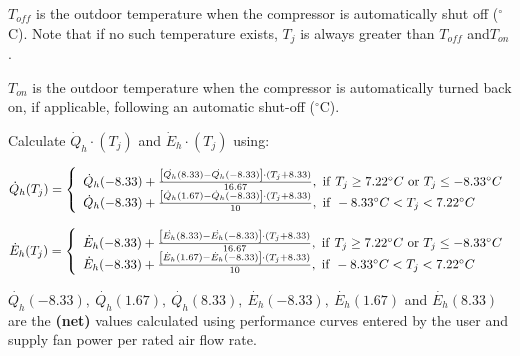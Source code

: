 \({T_{off}}\) is the outdoor temperature when the compressor is automatically shut off (\(^{\circ}\)C). Note that if no such temperature exists, \({T_j}\) is always greater than \({T_{off}}\) and\({T_{on}}\).

\({T_{on}}\) is the outdoor temperature when the compressor is automatically turned back on, if applicable, following an automatic shut-off (\(^{\circ}\)C).

Calculate \(\dot{Q}_{h} \cdot ({T_j})\) and \(\dot{E}_{h} \cdot ({T_j})\) using:

\begin{equation}
\dot{Q}_{h}({T_j}) = \left\{ \begin{array}{l}\dot{Q}_{h}(-8.33) + \frac{{\left[ {\dot{{Q}_{h}}(8.33) - \dot{{Q_h}}(-8.33)} \right] \cdot \left( {{T_j} + 8.33} \right)}}{{16.67}}{\rm{,~if~}}{T_j} \ge 7.22^{\circ}C {\rm{~or~}}{T_j} \le  -8.33^{\circ}C \\
\dot{Q}_{h}(-8.33) + \frac{{\left[ {\dot{Q}_{h}(1.67) - \dot{Q}_{h}(-8.33)} \right] \cdot \left( {{T_j} + 8.33} \right)}}{{10}}{\rm{,~if~}} -8.33^{\circ}C < {T_j} < 7.22^{\circ}C\end{array} \right.
\end{equation}

\begin{equation}
\dot{E}_{h}({T_j}) = \left\{ \begin{array}{l}\dot{E}_{h}(-8.33) + \frac{{\left[ {\dot{{E}_{h}}(8.33) - \dot{{E_h}}(-8.33)} \right] \cdot \left( {{T_j} + 8.33} \right)}}{{16.67}}{\rm{,~if~}}{T_j} \ge 7.22^{\circ}C {\rm{~or~}}{T_j} \le  -8.33^{\circ}C \\
\dot{E}_{h}(-8.33) + \frac{{\left[ {\dot{E}_{h}(1.67) - \dot{E}_{h}(-8.33)} \right] \cdot \left( {{T_j} + 8.33} \right)}}{{10}}{\rm{,~if~}} -8.33^{\circ}C < {T_j} < 7.22^{\circ}C\end{array} \right.
\end{equation}

\(\dot{Q_h}(-8.33),~\dot{Q_h}(1.67),~\dot{Q_h}(8.33),~\dot{E_h}(-8.33),~\dot{E_h}(1.67)\) and \(\dot{E_h}(8.33)\) are the \textbf{(net)} values calculated using performance curves entered by the user and supply fan power per rated air flow rate.

